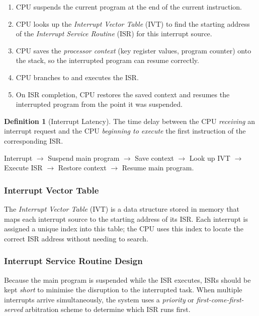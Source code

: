 \documentclass[11pt, a4paper, notitlepage]{report}
\theoremstyle{definition}
\newtheorem{definition}[theorem]{Definition}
\theoremstyle{remark}
\theoremstyle{definition}
\begin{document}
\begin{enumerate}
  \item CPU suspends the current program at the end of the current instruction.
  \item CPU looks up the \emph{Interrupt Vector Table} (IVT) to find the starting address of the \emph{Interrupt Service Routine} (ISR) for this interrupt source.
  \item CPU saves the \emph{processor context} (key register values, program counter) onto the stack, so the interrupted program can resume correctly.
  \item CPU branches to and executes the ISR.
  \item On ISR completion, CPU restores the saved context and resumes the interrupted program from the point it was suspended.
\end{enumerate}

\begin{definition}[Interrupt Latency]
  \label{def:interrupt-latency}
  The time delay between the CPU \emph{receiving} an interrupt request and the CPU \emph{beginning to execute} the first instruction of the corresponding ISR.
\end{definition}

\begin{keyresult}[title={Key Result: Interrupt Control Flow Summary}]
  Interrupt $\rightarrow$ Suspend main program $\rightarrow$ Save context $\rightarrow$ Look up IVT $\rightarrow$ Execute ISR $\rightarrow$ Restore context $\rightarrow$ Resume main program.
\end{keyresult}

\subsubsection{Interrupt Vector Table}

The \emph{Interrupt Vector Table} (IVT) is a data structure stored in memory that maps each interrupt source to the starting address of its ISR. Each interrupt is assigned a unique index into this table; the CPU uses this index to locate the correct ISR address without needing to search.

\subsubsection{Interrupt Service Routine Design}

Because the main program is suspended while the ISR executes, ISRs should be kept \emph{short} to minimise the disruption to the interrupted task. When multiple interrupts arrive simultaneously, the system uses a \emph{priority} or \emph{first-come-first-served} arbitration scheme to determine which ISR runs first.
\end{document}
